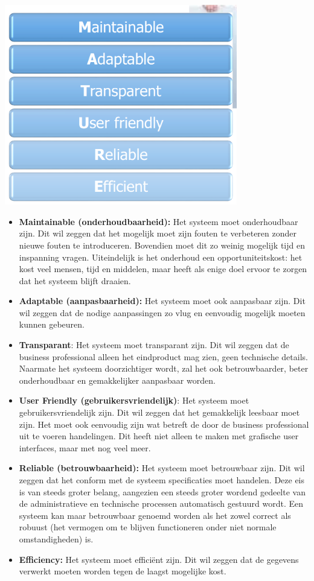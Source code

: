 \begin{center}
\includegraphics[width=4in]{img/requirementsforgoodsystem}%
\end{center}

\begin{itemize}
\item \textbf{Maintainable (onderhoudbaarheid):}
Het systeem moet onderhoudbaar zijn. Dit wil zeggen dat het mogelijk moet zijn fouten te verbeteren zonder nieuwe fouten te introduceren. Bovendien moet dit zo weinig mogelijk tijd en inspanning vragen. Uiteindelijk is het onderhoud een opportuniteitskost: het kost veel mensen, tijd en middelen, maar heeft als enige doel ervoor te zorgen dat het systeem blijft draaien.
\item \textbf{Adaptable (aanpasbaarheid):}
Het systeem moet ook aanpasbaar zijn. Dit wil zeggen dat de nodige aanpassingen zo vlug en eenvoudig mogelijk moeten kunnen gebeuren.
\item \textbf{Transparant}:
Het systeem moet transparant zijn. Dit wil zeggen dat de business professional alleen het eindproduct mag zien, geen technische details. Naarmate het systeem doorzichtiger wordt, zal het ook betrouwbaarder, beter onderhoudbaar en gemakkelijker aanpasbaar worden.
\item \textbf{User Friendly (gebruikersvriendelijk)}:
Het systeem moet gebruikersvriendelijk zijn. Dit wil zeggen dat het gemakkelijk leesbaar moet zijn. Het moet ook eenvoudig zijn wat betreft de door de business professional uit te voeren handelingen. Dit heeft niet alleen te maken met grafische user interfaces, maar met nog veel meer.
\item \textbf{Reliable (betrouwbaarheid):}
Het systeem moet betrouwbaar zijn. Dit wil zeggen dat het conform met de systeem specificaties moet handelen. Deze eis is van steeds groter belang, aangezien een steeds groter wordend gedeelte van de administratieve en technische processen automatisch gestuurd wordt. Een systeem kan maar betrouwbaar genoemd worden als het zowel correct als robuust (het vermogen om te blijven functioneren onder niet normale omstandigheden) is.
\item \textbf{Efficiency:}
Het systeem moet efficiënt zijn. Dit wil zeggen dat de gegevens verwerkt moeten worden tegen de laagst mogelijke kost.
\end{itemize}


